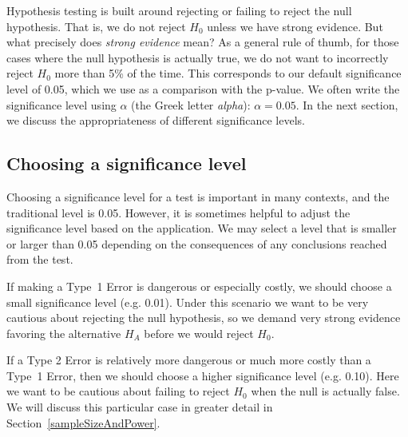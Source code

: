 Hypothesis testing is built around rejecting or failing to reject the null hypothesis. That is, we do not reject $H_0$ unless we have strong evidence. But what precisely does \emph{strong evidence} mean? As a general rule of thumb, for those cases where the null hypothesis is actually true, we do not want to incorrectly reject $H_0$ more than 5\% of the time. This corresponds to our default significance level of 0.05, which we use as a comparison with the p-value. We often write the significance level using $\alpha$ (the Greek letter \emph{alpha}): $\alpha = 0.05$. In the next section, we discuss the appropriateness of different significance levels.


\subsection{Choosing a significance level}
\label{significanceLevel}


Choosing a significance level for a test is important in many contexts, and the traditional level is 0.05. However, it is sometimes helpful to adjust the significance level based on the application. We may select a level that is smaller or larger than 0.05 depending on the consequences of any conclusions reached from the test.

If making a Type~1 Error is dangerous or especially costly, we should choose a small significance level (e.g. 0.01). Under this scenario we want to be very cautious about rejecting the null hypothesis, so we demand very strong evidence favoring the alternative $H_A$ before we would reject $H_0$.

If a Type 2 Error is relatively more dangerous or much more costly than a Type~1 Error, then we should choose a higher significance level (e.g. 0.10). Here we want to be cautious about failing to reject $H_0$ when the null is actually false.  We will discuss this particular case in greater detail in Section~\ref{sampleSizeAndPower}. 


